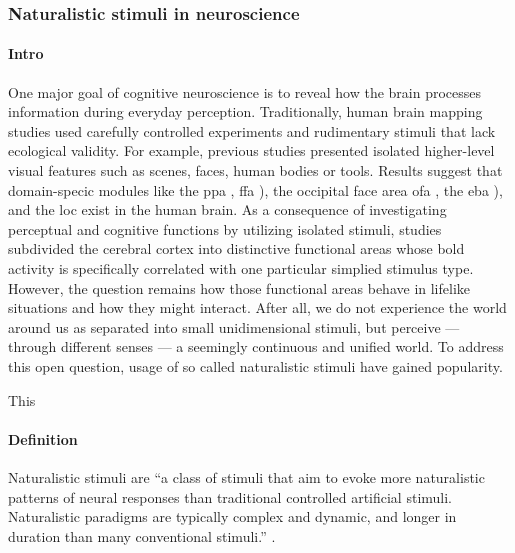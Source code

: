 \citep{chen2015reduced}




\subsubsection{Naturalistic stimuli in neuroscience}



\paragraph{Intro}

One major goal of cognitive neuroscience is to reveal how the brain processes
information during everyday perception.
%
Traditionally, human brain mapping studies used carefully controlled experiments
and rudimentary stimuli that lack ecological validity.
%
For example, previous studies presented isolated higher-level visual features
such as scenes, faces, human bodies or tools.
%
Results suggest that domain-specic modules like the \ac{ppa}
\citep{epstein1998ppa}, \ac{ffa} \citep{kanwisher1997ffa}), the occipital face
area \ac{ofa} \citep{pitcher2011occipitalfacearea}, the \ac{eba}
\citep{downing2001bodyarea}), and the \ac{loc} \citet{malach1995loc} exist in
the human brain.
%
As a consequence of investigating perceptual and cognitive functions by
utilizing isolated stimuli, studies subdivided the cerebral cortex into
distinctive functional areas whose \ac{bold} activity is specifically correlated
with one particular simplied stimulus type.
%
However, the question remains how those functional areas behave in lifelike
situations and how they might interact.
%
After all, we do not experience the
world around us as separated into small unidimensional stimuli, but perceive ---
through different senses --- a seemingly continuous and unified world.
%
To address
this open question, usage of so called naturalistic stimuli have gained
popularity.


 This


\paragraph{Definition}


%
Naturalistic stimuli are ``a class of stimuli that aim to evoke more
naturalistic patterns of neural responses than traditional controlled artificial
stimuli. Naturalistic paradigms are typically complex and dynamic, and longer
in duration than many conventional stimuli.'' \citep{vanderwal2019movies}.

